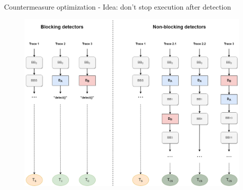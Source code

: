 \begin{frame}[fragile]{Countermeasure optimization - Idea: don't stop execution after detection }
\begin{tiny}
{\begin{figure}
                    \includegraphics[scale=0.14]{img/CCP-prop-stopping2-en.drawio.png}
                \end{figure}
        }
\end{tiny}
\end{frame}
